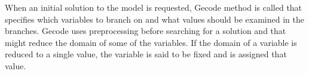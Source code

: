 When an initial solution to the model is requested, Gecode {} method is called that specifies which 
variables to branch on and what values should be examined in the branches. Gecode uses preprocessing before searching 
for a solution and that might reduce the domain of some of the variables. If the domain of a variable is reduced to a 
single value, the variable is said to be fixed and is assigned that value.   